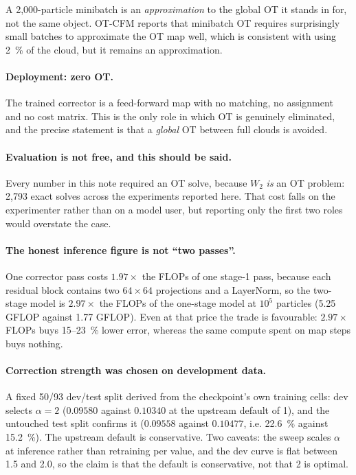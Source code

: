 ﻿\documentclass[11pt,a4paper]{article}
\newcommand{\Wtwo}{W_2}
\begin{document}
A 2{,}000-particle minibatch is an \emph{approximation} to the global OT it stands in for, not the
same object. OT-CFM reports that minibatch OT requires surprisingly small batches to approximate the
OT map well, which is consistent with using \SI{2}{\percent} of the cloud, but it remains an
approximation.

\paragraph{Deployment: zero OT.} The trained corrector is a feed-forward map with no matching, no
assignment and no cost matrix. This is the only role in which OT is genuinely eliminated, and the
precise statement is that a \emph{global} OT between full clouds is avoided.

\paragraph{Evaluation is not free, and this should be said.} Every number in this note required an
OT solve, because $\Wtwo$ \emph{is} an OT problem: 2{,}793 exact solves across the experiments
reported here. That cost falls on the experimenter rather than on a model user, but reporting only
the first two roles would overstate the case.

\paragraph{The honest inference figure is not ``two passes''.} One corrector pass costs
$1.97\times$ the FLOPs of one stage-1 pass, because each residual block contains two $64\times64$
projections and a LayerNorm, so the two-stage model is \textbf{$2.97\times$} the FLOPs of the
one-stage model at $10^5$ particles (5.25 GFLOP against 1.77 GFLOP). Even at
that price the trade is favourable: $2.97\times$ FLOPs buys \SI{15}{}--\SI{23}{\percent} lower error,
whereas the same compute spent on map steps buys nothing.

\paragraph{Correction strength was chosen on development data.} A fixed 50/93 dev/test split derived
from the checkpoint's own training cells: dev selects $\alpha=2$ ($0.09580$ against $0.10340$ at the
upstream default of 1), and the untouched test split confirms it ($0.09558$ against $0.10477$, i.e.
\SI{22.6}{\percent} against \SI{15.2}{\percent}). The upstream default is conservative. Two caveats:
the sweep scales $\alpha$ at inference rather than retraining per value, and the dev curve is flat
between 1.5 and 2.0, so the claim is that the default is conservative, not that 2 is optimal.
\end{document}

